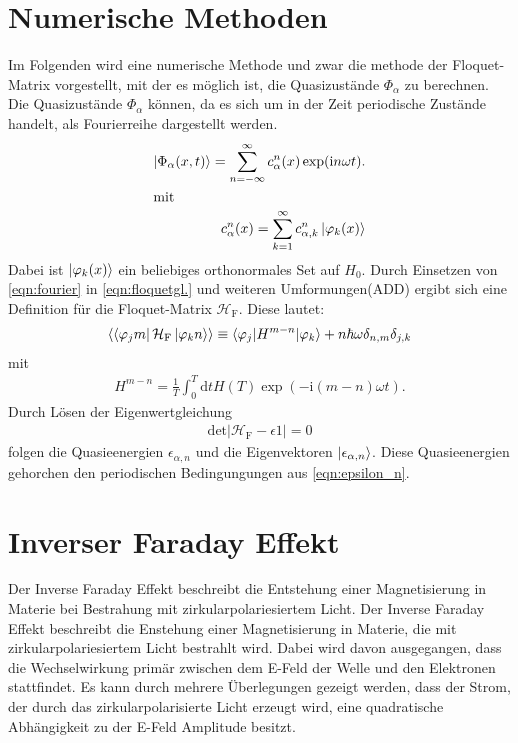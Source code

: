 \section{Numerische Methoden}
Im Folgenden wird eine numerische Methode und zwar die methode der Floquet-Matrix vorgestellt, mit der es möglich ist,
die Quasizustände $\Phi_\alpha$ zu berechnen.
Die Quasizustände $\Phi_\alpha$ können, da es sich um in der Zeit periodische Zustände handelt,
als Fourierreihe dargestellt werden.
\begin{align}
  \ket{\Phi_{\alpha}(x,t)}=\sum_{n=-\infty}^{\infty} c_{\alpha}^n (x) \label{eqn:fourier}
  \exp(\mathrm{i}n\omega t).\\
\intertext{mit}
 c_\alpha^n(x)=\sum_{k=1}^\infty c_{\alpha,k}^n \ket{\varphi_k(x)} %
\end{align}
Dabei ist $\ket{\varphi_k(x)}$ ein beliebiges orthonormales Set auf $H_0$.
Durch Einsetzen von \eqref{eqn:fourier} in \eqref{eqn:floquetgl.}
und weiteren Umformungen(ADD) ergibt sich eine Definition für die Floquet-Matrix $\mathcal{H}_\mathrm{F}$.
Diese lautet:
\begin{align}
  \braket{\bra{\varphi_j m}\mathcal{H}_\mathrm{F}\ket{\varphi_k n}}\equiv \braket{\varphi_j|H^{m-n}|\varphi_k} + n\hbar \omega \delta_{n,m}\delta_{j,k}
\end{align}
mit
\begin{align}
H^{m-n}=\frac{1}{T}\int_0^T \mathrm{d}t H(T) \exp\left(-\mathrm{i}(m-n)\omega t\right).
\end{align}
Durch Lösen der Eigenwertgleichung
\begin{align}
  \mathrm{det}|\mathcal{H}_\mathrm{F}-\epsilon\mathcal{1}|=0
\end{align}
folgen die Quasieenergien $\epsilon_{\alpha,n}$ und die Eigenvektoren $\ket{\epsilon_{\alpha,n}}$.
Diese Quasieenergien gehorchen den periodischen Bedingungungen aus \eqref{eqn:epsilon_n}.


\section{Inverser Faraday Effekt}
Der Inverse Faraday Effekt beschreibt die Entstehung einer Magnetisierung in Materie bei Bestrahung mit zirkularpolariesiertem Licht.
Der Inverse Faraday Effekt beschreibt die Enstehung einer Magnetisierung in Materie, die mit zirkularpolariesiertem Licht bestrahlt wird.
Dabei wird davon ausgegangen, dass die Wechselwirkung primär zwischen dem E-Feld der Welle und den Elektronen stattfindet.
Es kann durch mehrere Überlegungen gezeigt werden, dass der Strom, der durch das zirkularpolarisierte Licht erzeugt wird, eine quadratische Abhängigkeit
zu der E-Feld Amplitude besitzt.
